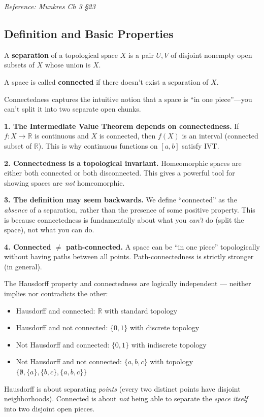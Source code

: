 \documentclass[11pt]{report}
\begin{document}
\textit{Reference: Munkres Ch 3 \S 23}

\subsection{Definition and Basic Properties}

\begin{defbox}
A \textbf{separation} of a topological space $X$ is a pair $U, V$ of disjoint nonempty open subsets of $X$ whose union is $X$.

A space is called \textbf{connected} if there doesn't exist a separation of $X$.
\end{defbox}

\begin{rembox}
Connectedness captures the intuitive notion that a space is ``in one piece''---you can't split it into two separate open chunks.

\textbf{1. The Intermediate Value Theorem depends on connectedness.} If $f: X \to \mathbb{R}$ is continuous and $X$ is connected, then $f(X)$ is an interval (connected subset of $\mathbb{R}$). This is why continuous functions on $[a,b]$ satisfy IVT.

\textbf{2. Connectedness is a topological invariant.} Homeomorphic spaces are either both connected or both disconnected. This gives a powerful tool for showing spaces are \emph{not} homeomorphic.

\textbf{3. The definition may seem backwards.} We define ``connected'' as the \emph{absence} of a separation, rather than the presence of some positive property. This is because connectedness is fundamentally about what you \emph{can't} do (split the space), not what you can do.

\textbf{4. Connected $\neq$ path-connected.} A space can be ``in one piece'' topologically without having paths between all points. Path-connectedness is strictly stronger (in general).
\end{rembox}

\begin{rembox}
The Hausdorff property and connectedness are logically independent — neither implies nor contradicts the other:
\begin{itemize}
    \item Hausdorff and connected: $\mathbb{R}$ with standard topology
    \item Hausdorff and not connected: $\{0, 1\}$ with discrete topology
    \item Not Hausdorff and connected: $\{0, 1\}$ with indiscrete topology
    \item Not Hausdorff and not connected: $\{a, b, c\}$ with topology $\{\emptyset, \{a\}, \{b,c\}, \{a,b,c\}\}$
\end{itemize}
Hausdorff is about separating \emph{points} (every two distinct points have disjoint neighborhoods). Connected is about \emph{not} being able to separate the \emph{space itself} into two disjoint open pieces.
\end{rembox}
\end{document}
